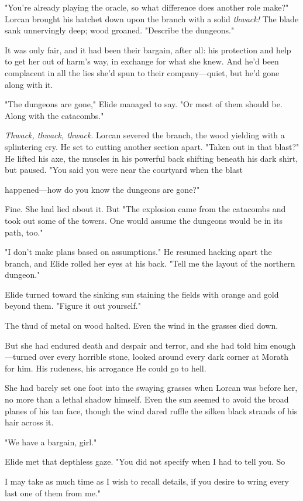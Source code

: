 "You're already playing the oracle, so what difference does another role make?" Lorcan brought his hatchet down upon the branch with a solid \emph{thwack!} The blade sank unnervingly deep; wood groaned. "Describe the dungeons."

It was only fair, and it had been their bargain, after all: his protection and help to get her out of harm's way, in exchange for what she knew. And he'd been complacent in all the lies she'd spun to their company---quiet, but he'd gone along with it.

"The dungeons are gone," Elide managed to say. "Or most of them should be. Along with the catacombs."

\emph{Thwack, thwack, thwack}. Lorcan severed the branch, the wood yielding with a splintering cry. He set to cutting another section apart. "Taken out in that blast?" He lifted his axe, the muscles in his powerful back shifting beneath his dark shirt, but paused. "You said you were near the courtyard when the blast

happened---how do you know the dungeons are gone?"

Fine. She had lied about it. But  "The explosion came from the catacombs and took out some of the towers. One would assume the dungeons would be in its path, too."

"I don't make plans based on assumptions." He resumed hacking apart the branch, and Elide rolled her eyes at his back. "Tell me the layout of the northern dungeon."

Elide turned toward the sinking sun staining the fields with orange and gold beyond them. "Figure it out yourself."

The thud of metal on wood halted. Even the wind in the grasses died down.

But she had endured death and despair and terror, and she had told him enough---turned over every horrible stone, looked around every dark corner at Morath for him. His rudeness, his arrogance  He could go to hell.

She had barely set one foot into the swaying grasses when Lorcan was before her, no more than a lethal shadow himself. Even the sun seemed to avoid the broad planes of his tan face, though the wind dared ruffle the silken black strands of his hair across it.

"We have a bargain, girl."

Elide met that depthless gaze. "You did not specify when I had to tell you. So

I may take as much time as I wish to recall details, if you desire to wring every last one of them from me."

